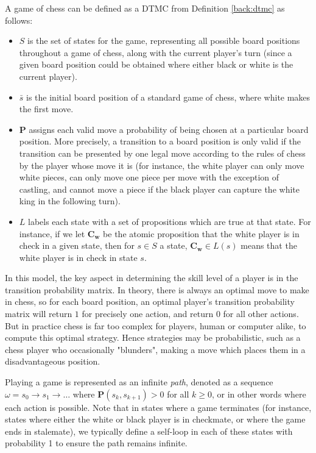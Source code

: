\begin{example}
\label{back:chess}

    A game of chess can be defined as a DTMC from Definition \ref{back:dtmc} as follows:

    \begin{itemize}
        \item $S$ is the set of states for the game, representing all possible board positions throughout a game of chess, along with the current player's turn (since a given board position could be obtained where either black or white is the current player).
        \item $\bar{s}$ is the initial board position of a standard game of chess, where white makes the first move.
        \item $\mathbf{P}$ assigns each valid move a probability of being chosen at a particular board position. More precisely, a transition to a board position is only valid if the transition can be presented by one legal move according to the rules of chess by the player whose move it is (for instance, the white player can only move white pieces, can only move one piece per move with the exception of castling, and cannot move a piece if the black player can capture the white king in the following turn).
        \item $L$ labels each state with a set of propositions which are true at that state. For instance, if we let $\mathbf{C_w}$ be the atomic proposition that the white player is in check in a given state, then for $s \in S$ a state, $\mathbf{C_w} \in L(s)$ means that the white player is in check in state $s$.
    \end{itemize}

    In this model, the key aspect in determining the skill level of a player is in the transition probability matrix. In theory, there is always an optimal move to make in chess, so for each board position, an optimal player's transition probability matrix will return $1$ for precisely one action, and return $0$ for all other actions. But in practice chess is far too complex for players, human or computer alike, to compute this optimal strategy. Hence strategies may be probabilistic, such as a chess player who occasionally "blunders", making a move which places them in a disadvantageous position.

\end{example}

Playing a game is represented as an infinite \emph{path}, denoted as a sequence $\omega = s_0 \rightarrow s_1 \rightarrow \dots$ where $\mathbf{P}(s_k, s_{k+1})>0$ for all $k\geq0$, or in other words where each action is possible. Note that in states where a game terminates (for instance, states where either the white or black player is in checkmate, or where the game ends in stalemate), we typically define a self-loop in each of these states with probability 1 to ensure the path remains infinite.

